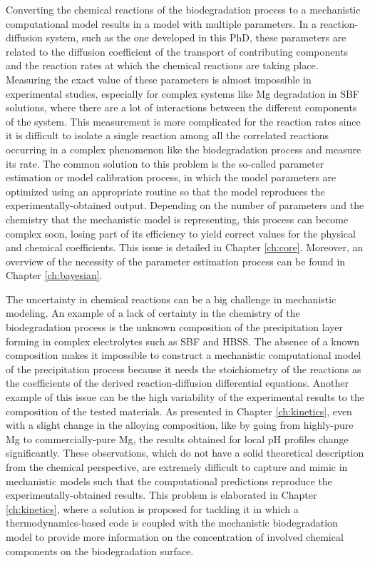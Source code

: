 Converting the chemical reactions of the biodegradation process to a mechanistic computational model results in a model with multiple parameters. In a reaction-diffusion system, such as the one developed in this PhD, these parameters are related to the diffusion coefficient of the transport of contributing components and the reaction rates at which the chemical reactions are taking place. Measuring the exact value of these parameters is almost impossible in experimental studies, especially for complex systems like Mg degradation in \gls{SBF} solutions, where there are a lot of interactions between the different components of the system. This measurement is more complicated for the reaction rates since it is difficult to isolate a single reaction among all the correlated reactions occurring in a complex phenomenon like the biodegradation process and measure its rate. The common solution to this problem is the so-called parameter estimation or model calibration process, in which the model parameters are optimized using an appropriate routine so that the model reproduces the experimentally-obtained output. Depending on the number of parameters and the chemistry that the mechanistic model is representing, this process can become complex soon, losing part of its efficiency to yield correct values for the physical and chemical coefficients. This issue is detailed in Chapter \ref{ch:core}. Moreover, an overview of the necessity of the parameter estimation process can be found in Chapter \ref{ch:bayesian}.

The uncertainty in chemical reactions can be a big challenge in mechanistic modeling. An example of a lack of certainty in the chemistry of the biodegradation process is the unknown composition of the precipitation layer forming in complex electrolytes such as \gls{SBF} and \gls{HBSS}. The absence of a known composition makes it impossible to construct a mechanistic computational model of the precipitation process because it needs the stoichiometry of the reactions as the coefficients of the derived reaction-diffusion differential equations.  Another example of this issue can be the high variability of the experimental results to the composition of the tested materials. As presented in Chapter \ref{ch:kinetics}, even with a slight change in the alloying composition, like by going from highly-pure Mg to commercially-pure Mg, the results obtained for local pH profiles change significantly. These observations, which do not have a solid theoretical description from the chemical perspective, are extremely difficult to capture and mimic in mechanistic models such that the computational predictions reproduce the experimentally-obtained results. This problem is elaborated in Chapter \ref{ch:kinetics}, where a solution is proposed for tackling it in which a thermodynamics-based code is coupled with the mechanistic biodegradation model to provide more information on the concentration of involved chemical components on the biodegradation surface.

